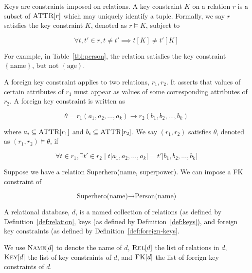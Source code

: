 	\begin{defn}[Keys]
	\label{def:keys}
		Keys are constraints imposed on relations.  A key constraint $K$ on a relation $r$ is a subset of $\textsc{ATTR}\lbrack r\rbrack$ which may uniquely identify a tuple.  Formally, we say $r$ satisfies the key constraint $K$, denoted as $r \models K$, subject to
		
		$$\forall t, t' \in r, t \not= t' \implies t[K] \not= t'[K]$$
		
		For example, in Table~\ref{tbl:person}, the relation satisfies the key constraint $\left\{\mathrm{name}\right\}$, but not $\left\{\mathrm{age}\right\}$.
	\end{defn}
	
	\begin{defn}
	\label{def:foreign-keys}
		A foreign key constraint applies to two relations, $r_1, r_2$.  It asserts that values of certain attributes of $r_1$ must appear as values of some corresponding attributes of $r_2$.  A foreign key constraint is written as
		
		$$\theta = r_1(a_1, a_2, \dotsc, a_k) \rightarrow r_2(b_1, b_2, \dotsc, b_k)$$
		
		where $a_i \subseteq \textsc{ATTR}\lbrack r_1\rbrack$ and $b_i \subseteq \textsc{ATTR}\lbrack r_2\rbrack$.  We say $(r_1, r_2)$ satisfies $\theta$, denoted as $(r_1, r_2) \models \theta$, if
		
		$$\forall t \in r_1, \exists t' \in r_2 \mid t\lbrack a_1, a_2, \dotsc, a_k\rbrack = t'\lbrack b_1, b_2, \dotsc, b_k]$$
		
		\begin{ex}
			Suppose we have a relation Superhero(name, superpower).  We can impose a FK constraint of
			
			$$\textrm{Superhero(name)} \rightarrow \textrm{Person(name)}$$
		\end{ex}
	\end{defn}
	
	\begin{defn}
	\label{def:relational-database}
		A relational database, $d$, is a named collection of relations (as defined by Definition~\ref{def:relation}, keys (as defined by Definition~\ref{def:keys}), and foreign key constraints (as defined by Definition~\ref{def:foreign-keys}.
		
		We use $\textsc{Name}\lbrack d\rbrack$ to denote the name of $d$, $\textsc{Rel}\lbrack d\rbrack$ the list of relations in $d$, $\textsc{Key}\lbrack d\rbrack$ the list of key constraints of $d$, and $\textsc{FK}\lbrack d\rbrack$ the list of foreign key constraints of $d$.
	\end{defn}
	
